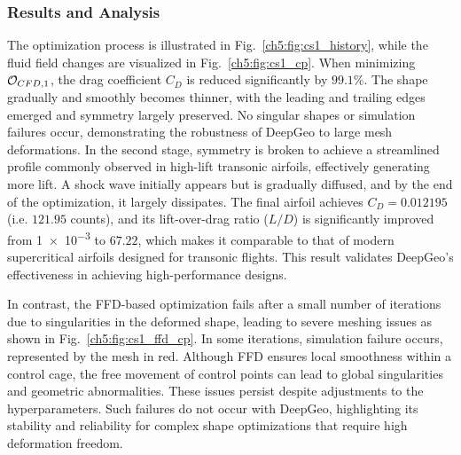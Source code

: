 \subsubsection{Results and Analysis}
\label{ch5:sec:circle_2_airfoil_result}

The optimization process is illustrated in Fig.~\ref{ch5:fig:cs1_history}, while the fluid field changes are visualized in Fig.~\ref{ch5:fig:cs1_cp}. When minimizing $\mathcal{O}_{CFD,1}$, the drag coefficient $C_D$ is reduced significantly by $99.1\%$.
The shape gradually and smoothly becomes thinner, with the leading and trailing edges emerged and symmetry largely preserved. No singular shapes or simulation failures occur, demonstrating the robustness of DeepGeo to large mesh deformations.
In the second stage, symmetry is broken to achieve a streamlined profile commonly observed in high-lift transonic airfoils, effectively generating more lift.
A shock wave initially appears but is gradually diffused, and by the end of the optimization, it largely dissipates.
The final airfoil achieves  $C_D=\num{0.012195}$ (i.e. $121.95$ counts), and its lift-over-drag ratio ($L/D$) is significantly improved from \num{1e-3} to $67.22$, which makes it  comparable to that of modern supercritical airfoils designed for transonic flights. This result validates DeepGeo’s effectiveness in achieving high-performance designs.

In contrast, the FFD-based optimization fails after a small number of iterations due to singularities in the deformed shape, leading to severe meshing issues as shown in Fig.~\ref{ch5:fig:cs1_ffd_cp}. In some iterations, simulation failure occurs, represented by the mesh in red. 
Although FFD ensures local smoothness within a control cage, the free movement of control points can lead to global singularities and geometric abnormalities. These issues persist despite adjustments to the hyperparameters. Such failures do not occur with DeepGeo, highlighting its stability and reliability for complex shape optimizations that require high deformation freedom. 